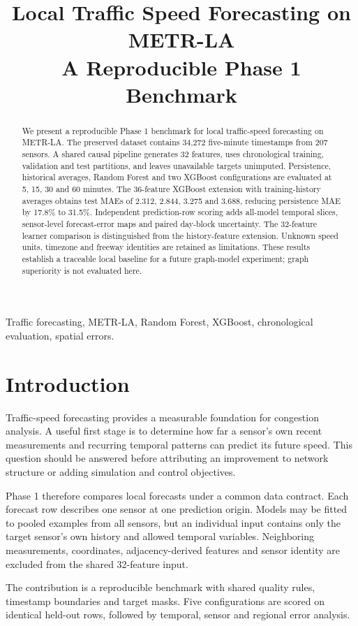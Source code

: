 \documentclass[conference]{IEEEtran}
\title{Local Traffic Speed Forecasting on METR-LA\\A Reproducible Phase 1 Benchmark}
\author{\IEEEauthorblockN{Pankaj Baid, Ashutosh Singh, Shreya Suman\\Narendra Singh, Ranvendra Pratap Singh}}
\begin{document}
\maketitle
\begin{abstract}
We present a reproducible Phase 1 benchmark for local traffic-speed forecasting on METR-LA. The preserved dataset contains 34,272 five-minute timestamps from 207 sensors. A shared causal pipeline generates 32 features, uses chronological training, validation and test partitions, and leaves unavailable targets unimputed. Persistence, historical averages, Random Forest and two XGBoost configurations are evaluated at 5, 15, 30 and 60 minutes. The 36-feature XGBoost extension with training-history averages obtains test MAEs of 2.312, 2.844, 3.275 and 3.688, reducing persistence MAE by 17.8\% to 31.5\%. Independent prediction-row scoring adds all-model temporal slices, sensor-level forecast-error maps and paired day-block uncertainty. The 32-feature learner comparison is distinguished from the history-feature extension. Unknown speed units, timezone and freeway identities are retained as limitations. These results establish a traceable local baseline for a future graph-model experiment; graph superiority is not evaluated here.
\end{abstract}
\begin{IEEEkeywords}Traffic forecasting, METR-LA, Random Forest, XGBoost, chronological evaluation, spatial errors.\end{IEEEkeywords}
\section{Introduction}
Traffic-speed forecasting provides a measurable foundation for congestion analysis. A useful first stage is to determine how far a sensor's own recent measurements and recurring temporal patterns can predict its future speed. This question should be answered before attributing an improvement to network structure or adding simulation and control objectives.

Phase 1 therefore compares local forecasts under a common data contract. Each forecast row describes one sensor at one prediction origin. Models may be fitted to pooled examples from all sensors, but an individual input contains only the target sensor's own history and allowed temporal variables. Neighboring measurements, coordinates, adjacency-derived features and sensor identity are excluded from the shared 32-feature input.

The contribution is a reproducible benchmark with shared quality rules, timestamp boundaries and target masks. Five configurations are scored on identical held-out rows, followed by temporal, sensor and regional error analysis.
\end{document}
